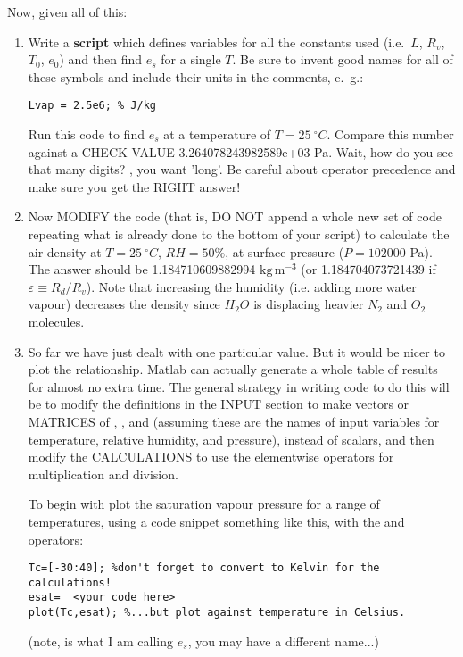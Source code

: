 \documentclass[letterpaper]{article}
\begin{document}
Now, given all of this:
\begin{enumerate}
\item Write a {\bf script} which defines variables for all the constants used
(i.e.~$L$, $R_v$, $T_0$, $e_0$) and then find
$e_s$ for a single $T$.  Be sure to invent good names for
all of these symbols and include their units in the comments, e.~g.:

\begin{verbatim}
Lvap = 2.5e6; % J/kg
\end{verbatim}

Run this code to find $e_s$ at a temperature of $T=25\ ^\circ C$. Compare this number against
a CHECK VALUE 3.264078243982589e+03 Pa. Wait, how do you see that many digits? ,
you want 'long'. Be careful about operator 
precedence and make sure you get the RIGHT answer!

\item Now MODIFY the code (that is, DO NOT append a whole new set of code repeating what is already done to
the bottom of your script) to  calculate
the air density at $T=25\ ^\circ C$, $RH=50\%$,
at surface pressure ($P=102000$ Pa). The answer should be 1.184710609882994 $\mathrm{kg\,m^{-3}}$ (or
1.184704073721439 if $\varepsilon\equiv R_d/R_v$). Note
that increasing the humidity (i.e. adding more water vapour) decreases 
the density since $H_2O$ is displacing heavier $N_2$ and $O_2$  molecules.

\item So far we have just dealt with one particular value. But it would be nicer
to plot the relationship.  Matlab can actually
generate a whole table of results for almost no extra time. The general strategy in writing code to do this will be to modify the definitions in the INPUT
section to make vectors or MATRICES
of , , and  (assuming these are the names of input variables for temperature, relative humidity,
and pressure), instead of scalars, and then modify the CALCULATIONS to use the elementwise operators for multiplication and
division. 

To begin with plot the saturation vapour pressure for a range of
temperatures, using a code snippet something like this, with the  and  operators:
\begin{lstlisting}
Tc=[-30:40]; %don't forget to convert to Kelvin for the calculations!
esat=  <your code here>
plot(Tc,esat); %...but plot against temperature in Celsius.
\end{lstlisting}
(note,  is what I am calling $e_s$, you may have a different name...)


\end{enumerate}
\end{document}
